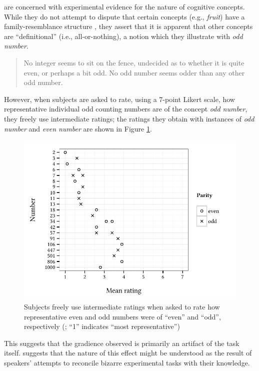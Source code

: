 \citet{Armstrong1983} are concerned with experimental evidence for the nature of cognitive concepts. 
While they do not attempt to dispute that certain concepts (e.g., \emph{fruit}) have a family-resemblance structure \citep[e.g.,][]{Rosch1975a}, they assert that it is apparent that other concepts are ``definitional'' (i.e., all-or-nothing), a notion which they illustrate with \emph{odd number}.

\begin{quote}
No integer seems to sit on the fence, undecided as to whether it is quite even, or perhaps a bit odd. No odd number seems odder than any other odd number. \citep[274]{Armstrong1983}
\end{quote}

\noindent
However, when subjects are asked to rate, using a 7-point Likert scale, how representative individual odd counting numbers are of the concept \emph{odd number}, they freely use intermediate ratings; the ratings they obtain with instances of \emph{odd number} and \emph{even number} are shown in Figure \ref{agg}.

\begin{figure}[t]
\centering
\includegraphics{agg.pdf}
\caption{Subjects freely use intermediate ratings when asked to rate how representative even and odd numbers were of ``even'' and ``odd'', respectively (\citealp{Armstrong1983}; ``1'' indicates ``most representative'')}
\label{agg}
\end{figure}

This suggests that the gradience observed is primarily an artifact of the task itself. \citeauthor{Schutze2011} suggests that the nature of this effect might be understood as the result of speakers' attempts to reconcile bizarre experimental tasks with their knowledge.

